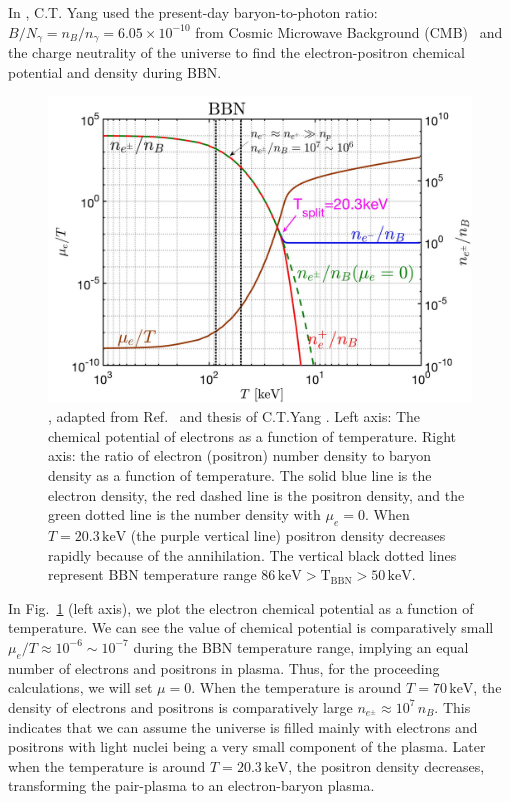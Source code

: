 In \cite{Grayson:2022asf}, C.T. Yang used the present-day baryon-to-photon ratio: $B/N_\gamma =n_B/n_\gamma= 6.05\times10^{-10}$ from Cosmic Microwave Background (CMB)~\cite{ParticleDataGroup:2022pth} and the charge neutrality of the universe to find the electron-positron chemical potential and density during BBN.

\begin{figure}[ht]
\begin{center}
\includegraphics[width=0.95\linewidth]{plots/chap03BBN/May152023_EPDensity_Chemical}
\caption{, adapted from Ref.~\cite{Grayson:2023flr} and thesis of C.T.Yang \cite{Yang:2024ret}. Left axis: The chemical potential of electrons as a function of temperature. Right axis: the ratio of electron (positron) number density to baryon density as a function of temperature. The solid blue line is the electron density, the red dashed line is the positron density, and the green dotted line is the number density with $\mu_e=0$. When $T=20.3\,\mathrm{keV}$ (the purple vertical line) positron density decreases rapidly because of the annihilation. The vertical black dotted lines represent BBN temperature range $86\,\mathrm{keV}>\mathrm{T_{BBN}}>50\,\mathrm{keV}$.}
\label{BBN_Electron}
\end{center}
\end{figure}

In Fig.~\ref{BBN_Electron} (left axis), we plot the electron chemical potential as a function of temperature. We can see the value of chemical potential is comparatively small $\mu_e/T\approx10^{-6}\sim10^{-7}$ during the BBN temperature range, implying an equal number of electrons and positrons in plasma. Thus, for the proceeding calculations, we will set $\mu =0$. When the temperature is around $T=70\,\mathrm{keV}$, the density of electrons and positrons is comparatively large $n_{e^\pm}\approx10^7\,n_B$. This indicates that we can assume the universe is filled mainly with electrons and positrons with light nuclei being a very small component of the plasma. Later when the temperature is around $T=20.3\,\mathrm{keV}$, the positron density decreases, transforming the pair-plasma to an electron-baryon plasma.


